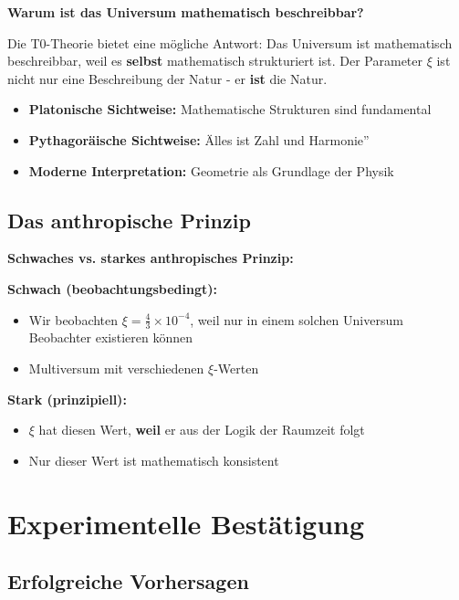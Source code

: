 	\begin{foundation}
		\textbf{Warum ist das Universum mathematisch beschreibbar?}
		
		Die T0-Theorie bietet eine mögliche Antwort: Das Universum ist mathematisch beschreibbar, weil es \textbf{selbst} mathematisch strukturiert ist. Der Parameter $\xi$ ist nicht nur eine Beschreibung der Natur - er \textbf{ist} die Natur.
		
		\begin{itemize}
			\item \textbf{Platonische Sichtweise:} Mathematische Strukturen sind fundamental
			\item \textbf{Pythagoräische Sichtweise:} Älles ist Zahl und Harmonie''
			\item \textbf{Moderne Interpretation:} Geometrie als Grundlage der Physik
		\end{itemize}
	\end{foundation}
	
	\subsection{Das anthropische Prinzip}
	
	\begin{alternative}
		\textbf{Schwaches vs. starkes anthropisches Prinzip:}
		
		\textbf{Schwach (beobachtungsbedingt):}
		\begin{itemize}
			\item Wir beobachten $\xi = \frac{4}{3} \times 10^{-4}$, weil nur in einem solchen Universum Beobachter existieren können
			\item Multiversum mit verschiedenen $\xi$-Werten
		\end{itemize}
		
		\textbf{Stark (prinzipiell):}
		\begin{itemize}
			\item $\xi$ hat diesen Wert, \textbf{weil} er aus der Logik der Raumzeit folgt
			\item Nur dieser Wert ist mathematisch konsistent
		\end{itemize}
	\end{alternative}
	
	\section{Experimentelle Bestätigung}
	
	\subsection{Erfolgreiche Vorhersagen}
	
